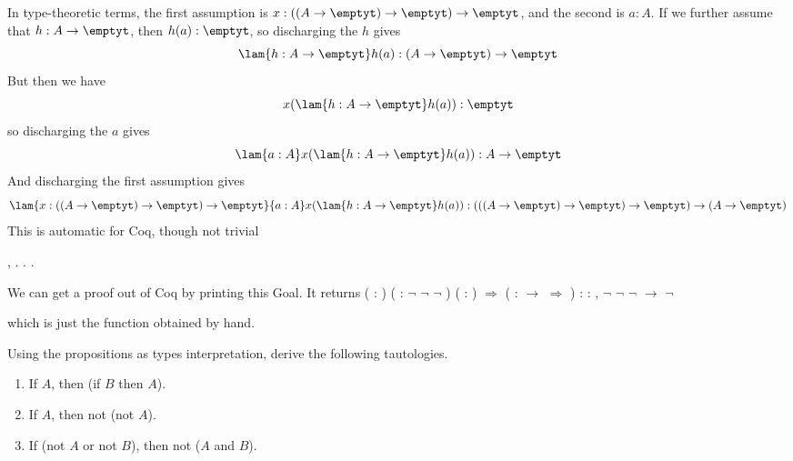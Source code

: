 In type-theoretic terms, the first assumption is $x : ((A \to \emptyt) \to
\emptyt) \to \emptyt$, and the second is $a : A$.  If we further assume that
$h : A \to \emptyt$, then $h(a) : \emptyt$, so discharging the $h$ gives
\[
  \lam{h:A \to \emptyt}h(a) : (A \to \emptyt) \to \emptyt
\]
But then we have
\[
  x(\lam{h : A \to \emptyt}h(a)) : \emptyt
\]
so discharging the $a$ gives
\[
  \lam{a:A}x(\lam{h : A \to \emptyt}h(a)) : A \to \emptyt
\]
And discharging the first assumption gives
\[
  \lam{x:((A\to\emptyt)\to\emptyt)\to\emptyt}{a:A}x(\lam{h : A \to
    \emptyt}h(a)) :
  (((A \to \emptyt) \to \emptyt) \to \emptyt) \to (A \to \emptyt)
\]
This is automatic for Coq, though not trivial \begin{coqdoccode}
\coqdocemptyline
\coqdocnoindent
{} \coqdockw{\ensuremath{\forall}} , \coqdocnotation{\ensuremath{\lnot}} \coqdocnotation{\ensuremath{\lnot}} \coqdocnotation{\ensuremath{\lnot}}   \coqdocnotation{\ensuremath{\lnot}}. . .\coqdoceol
\coqdocemptyline
\end{coqdoccode}


\noindent 
We can get a proof out of Coq by printing this
Goal.  It returns
\coqdoceol
\coqdocemptyline
\coqdocnoindent
{} ( : ) ( : \ensuremath{\lnot} \ensuremath{\lnot} \ensuremath{\lnot} ) ( : ) \ensuremath{\Rightarrow}  (  :  \ensuremath{\rightarrow}  \ensuremath{\Rightarrow}  ) \coqdoceol
\coqdocnoindent
: \coqdockw{\ensuremath{\forall}}  : , \ensuremath{\lnot} \ensuremath{\lnot} \ensuremath{\lnot}  \ensuremath{\rightarrow} \ensuremath{\lnot} 

\coqdocemptyline
\noindent
which is just the function obtained by hand. \begin{coqdoccode}
\coqdocemptyline
\end{coqdoccode}
Using the propositions as types interpretation, derive the
following tautologies.
\begin{enumerate}
\item If $A$, then (if $B$ then $A$).
\item If $A$, then not (not $A$).
\item If (not $A$ or not $B$), then not ($A$ and $B$).
\end{enumerate} \begin{coqdoccode}
\coqdocemptyline
\end{coqdoccode}


